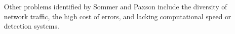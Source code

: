 \documentclass[sigconf]{acmart}
\begin{document}
\vspace{0.2cm}
Other problems identified by Sommer and Paxson include the diversity of network traffic, the high cost of errors, and lacking computational speed or detection systems.





 


\end{document}
